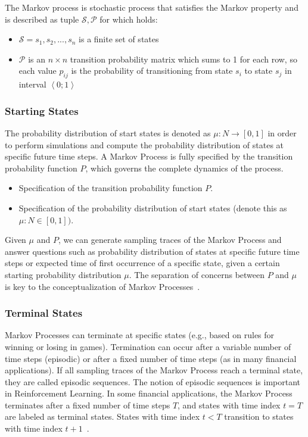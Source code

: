 \documentclass[../xlapes02]{subfiles}
\begin{document}
    The Markov process is stochastic process that satisfies the Markov property and is described as tuple $\mathcal{S}, \mathcal{P}$ for which holds:
    \begin{itemize}
        \item $\mathcal{S} = s_1, s_2, ..., s_n$ is a finite set of states
        \item $\mathcal{P}$ is an $n\times n$ transition probability matrix which sums to 1 for each row, so each value $p_{ij}$ is the probability of transitioning from state $s_i$ to state $s_j$ in interval $\left< 0;1 \right>$
    \end{itemize}

    \subsubsection{Starting States}
    The probability distribution of start states is denoted as $\mu : N \rightarrow [0,1]$ in order to perform simulations and compute the probability distribution of states at specific future time steps.
    A Markov Process is fully specified by the transition probability function $P$, which governs the complete dynamics of the process.
    \begin{itemize}
        \item Specification of the transition probability function $P$.
        \item Specification of the probability distribution of start states (denote this as $\mu : N \in[0, 1])$.
    \end{itemize}
    Given $\mu$ and $P$, we can generate sampling traces of the Markov Process and answer questions such as probability distribution of states at specific future time steps or expected time of first occurrence of a specific state, given a certain starting probability distribution $\mu$.
    The separation of concerns between $P$ and $\mu$ is key to the conceptualization of Markov Processes~\cite{rao2022foundations}.

    \subsubsection{Terminal States}
    Markov Processes can terminate at specific states (e.g., based on rules for winning or losing in games).
    Termination can occur after a variable number of time steps (episodic) or after a fixed number of time steps (as in many financial applications).
    If all sampling traces of the Markov Process reach a terminal state, they are called episodic sequences.
    The notion of episodic sequences is important in Reinforcement Learning.
    In some financial applications, the Markov Process terminates after a fixed number of time steps $T$, and states with time index $t = T$ are labeled as terminal states.
    States with time index $t < T$ transition to states with time index $t + 1$~\cite{rao2022foundations}.
\end{document}
